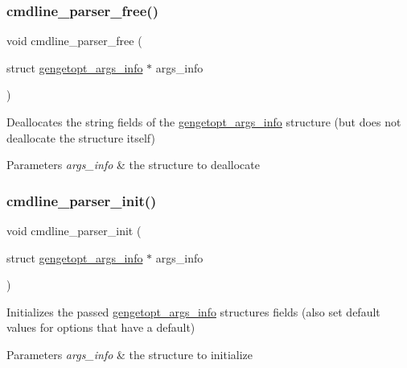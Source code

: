 \subsubsection{\texorpdfstring{cmdline\+\_\+parser\+\_\+free()}{cmdline\_parser\_free()}}
{\footnotesize\ttfamily void cmdline\+\_\+parser\+\_\+free (\begin{DoxyParamCaption}\item[{struct \hyperlink{structgengetopt__args__info}{gengetopt\+\_\+args\+\_\+info} $\ast$}]{args\+\_\+info }\end{DoxyParamCaption})}

Deallocates the string fields of the \hyperlink{structgengetopt__args__info}{gengetopt\+\_\+args\+\_\+info} structure (but does not deallocate the structure itself) 
\begin{DoxyParams}{Parameters}
{\em args\+\_\+info} & the structure to deallocate \\
\hline
\end{DoxyParams}
\mbox{\label{aes-getopt_8h_aca62b50d03d0d082968eeb1940f98650}} 
\subsubsection{\texorpdfstring{cmdline\+\_\+parser\+\_\+init()}{cmdline\_parser\_init()}}
{\footnotesize\ttfamily void cmdline\+\_\+parser\+\_\+init (\begin{DoxyParamCaption}\item[{struct \hyperlink{structgengetopt__args__info}{gengetopt\+\_\+args\+\_\+info} $\ast$}]{args\+\_\+info }\end{DoxyParamCaption})}

Initializes the passed \hyperlink{structgengetopt__args__info}{gengetopt\+\_\+args\+\_\+info} structure\textquotesingle{}s fields (also set default values for options that have a default) 
\begin{DoxyParams}{Parameters}
{\em args\+\_\+info} & the structure to initialize \\
\hline
\end{DoxyParams}
\mbox{\label{aes-getopt_8h_afd778af110fe0ee1ea5eac7aa9939d92}} 
